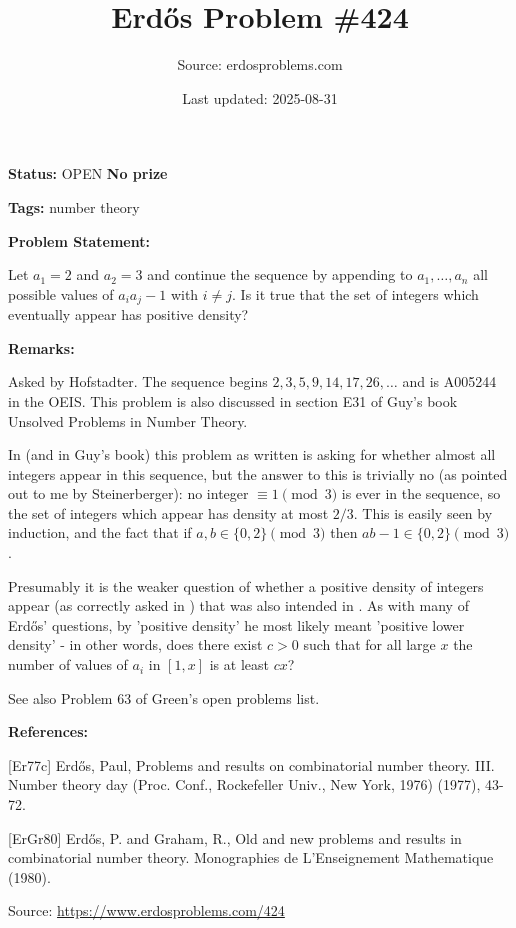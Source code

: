 \documentclass{article}
\title{Erd\H{o}s Problem \#424}
\date{Last updated: 2025-08-31}
\author{Source: erdosproblems.com}
\begin{document}
\maketitle

\noindent\textbf{Status:} OPEN \quad \textbf{No prize}

\noindent\textbf{Tags:} number theory

\medskip
\noindent\textbf{Problem Statement:}

Let $a_1=2$ and $a_2=3$ and continue the sequence by appending to $a_1,\ldots,a_n$ all possible values of $a_ia_j-1$ with $i\neq j$. Is it true that the set of integers which eventually appear has positive density?

\bigskip
\noindent\textbf{Remarks:}

Asked by Hofstadter. The sequence begins $2,3,5,9,14,17,26,\ldots$ and is A005244 in the OEIS. This problem is also discussed in section E31 of Guy's book Unsolved Problems in Number Theory.

In \cite{ErGr80} (and in Guy's book) this problem as written is asking for whether almost all integers appear in this sequence, but the answer to this is trivially no (as pointed out to me by Steinerberger): no integer $\equiv 1\pmod{3}$ is ever in the sequence, so the set of integers which appear has density at most $2/3$. This is easily seen by induction, and the fact that if $a,b\in \{0,2\}\pmod{3}$ then $ab-1\in \{0,2\}\pmod{3}$.

Presumably it is the weaker question of whether a positive density of integers appear (as correctly asked in \cite{Er77c}) that was also intended in \cite{ErGr80}. As with many of Erd\H{o}s' questions, by 'positive density' he most likely meant 'positive lower density' - in other words, does there exist $c>0$ such that for all large $x$ the number of values of $a_i$ in $[1,x]$ is at least $cx$?

See also Problem 63 of Green's open problems list.

\bigskip
\noindent\textbf{References:}

[Er77c] Erd\H{o}s, Paul, Problems and results on combinatorial number theory. III. Number theory day (Proc. Conf., Rockefeller Univ.,
New York, 1976) (1977), 43-72.
 
 [ErGr80] Erd\H{o}s, P. and Graham, R., Old and new problems and results in combinatorial number theory. Monographies de L'Enseignement Mathematique (1980).

\bigskip
\noindent\small{Source: \url{https://www.erdosproblems.com/424}}
\end{document}
